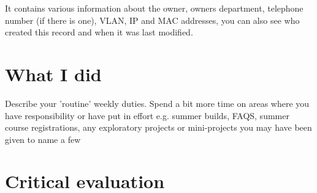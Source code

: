 \documentclass[10pt,a4paper,headinclude=true]{report}
\begin{document}
It contains various information about the owner, owners department, telephone number (if there is one), VLAN, IP and MAC addresses, you can also see who created this record and when it was last modified.

\chapter{What I did}
Describe your 'routine' weekly duties. Spend a bit more time on areas where you have
responsibility or have put in effort e.g. summer builds, FAQS, summer course
registrations, any exploratory projects or mini-projects you may have been given to
name a few

\chapter{Critical evaluation}
\end{document}

